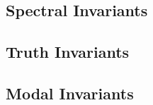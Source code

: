 \subsection{Spectral Invariants}
\begin{definition}
\end{definition}

\subsection{Truth Invariants}
\begin{definition}
\end{definition}

\subsection{Modal Invariants}
\begin{definition}
\end{definition}
